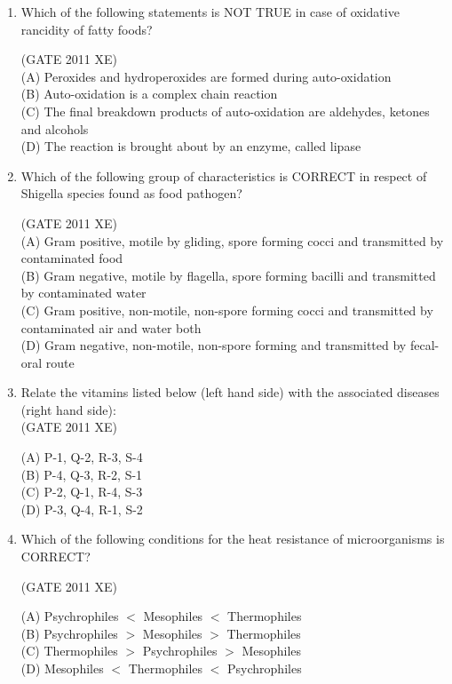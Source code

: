 \documentclass[journal,12pt,onecolumn]{IEEEtran}
\begin{document}
\begin{enumerate}
\item Which of the following statements is NOT TRUE in case of oxidative rancidity of fatty foods?

\hfill{(GATE 2011 XE)} \\

(A) Peroxides and hydroperoxides are formed during auto-oxidation \\
(B) Auto-oxidation is a complex chain reaction \\
(C) The final breakdown products of auto-oxidation are aldehydes, ketones and alcohols \\
(D) The reaction is brought about by an enzyme, called lipase


\item Which of the following group of characteristics is CORRECT in respect of Shigella species found as food pathogen?

\hfill{(GATE 2011 XE)} \\

(A) Gram positive, motile by gliding, spore forming cocci and transmitted by contaminated food \\
(B) Gram negative, motile by flagella, spore forming bacilli and transmitted by contaminated water \\
(C) Gram positive, non-motile, non-spore forming cocci and transmitted by contaminated air and water both \\
(D) Gram negative, non-motile, non-spore forming and transmitted by fecal-oral route

\newpage

\item Relate the vitamins listed below (left hand side) with the associated diseases (right hand side):\\




\hfill{(GATE 2011 XE)} \\
\begin{multicols}{4}
(A) P-1, Q-2, R-3, S-4 \\
(B) P-4, Q-3, R-2, S-1 \\
(C) P-2, Q-1, R-4, S-3 \\
(D) P-3, Q-4, R-1, S-2
\end{multicols}

\item Which of the following conditions for the heat resistance of microorganisms is CORRECT?

\hfill{(GATE 2011 XE)} \\
\begin{multicols}{2}
(A) Psychrophiles $<$ Mesophiles $<$ Thermophiles \\
(B) Psychrophiles $>$ Mesophiles $>$ Thermophiles \\
(C) Thermophiles $>$ Psychrophiles $>$ Mesophiles \\
(D) Mesophiles $<$ Thermophiles $<$ Psychrophiles
\end{multicols}


\end{enumerate}
\end{document}
